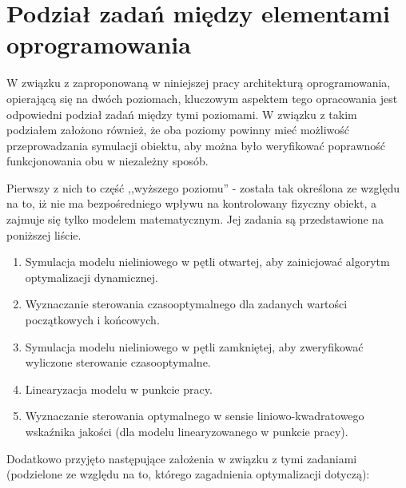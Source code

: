 \section{Podział zadań między elementami oprogramowania}
\label{sec:podzial-zadan}

W związku z zaproponowaną w niniejszej pracy architekturą oprogramowania, opierającą się na dwóch poziomach, kluczowym aspektem tego opracowania jest odpowiedni podział zadań między tymi poziomami. W związku z takim podziałem założono również, że oba poziomy powinny mieć możliwość przeprowadzania symulacji obiektu, aby można było weryfikować poprawność funkcjonowania obu w niezależny sposób.

Pierwszy z nich to część ,,wyższego poziomu'' - została tak określona ze względu na to, iż nie ma bezpośredniego wpływu na kontrolowany fizyczny obiekt, a zajmuje się tylko modelem matematycznym. Jej zadania są przedstawione na poniższej liście.

\begin{enumerate}
    \item Symulacja modelu nieliniowego w pętli otwartej, aby zainicjować algorytm optymalizacji dynamicznej.
    \item Wyznaczanie sterowania czasooptymalnego dla zadanych wartości początkowych i końcowych.
    \item Symulacja modelu nieliniowego w pętli zamkniętej, aby zweryfikować wyliczone sterowanie czasooptymalne.
    \item Linearyzacja modelu w punkcie pracy.
    \item Wyznaczanie sterowania optymalnego w sensie liniowo-kwadratowego wskaźnika jakości (dla modelu linearyzowanego w punkcie pracy).
\end{enumerate}

Dodatkowo przyjęto następujące założenia w związku z tymi zadaniami (podzielone ze względu na to, którego zagadnienia optymalizacji dotyczą):


